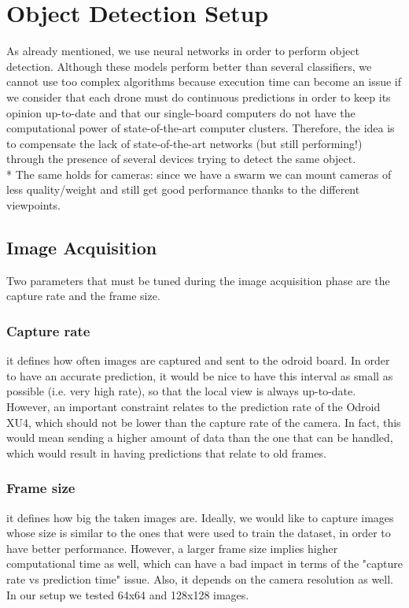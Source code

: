 \documentclass[10pt,conference,compsocconf]{IEEEtran}
\begin{document}
\section{Object Detection Setup}
\label{sec:obj_det_setup}
As already mentioned, we use neural networks in order to perform object detection. Although these models perform better than several classifiers, we cannot use too complex algorithms because execution time can become an issue if we consider that each drone must do continuous predictions in order to keep its opinion up-to-date and that our single-board computers do not have the computational power of state-of-the-art computer clusters. Therefore, the idea is to compensate the lack of state-of-the-art networks (but still performing!) through the presence of several devices trying to detect the same object.\\*
The same holds for cameras: since we have a swarm we can mount cameras of less quality/weight and still get good performance thanks to the different viewpoints.
\subsection{Image Acquisition}
Two parameters that must be tuned during the image acquisition phase are the capture rate and the frame size.
\subsubsection{Capture rate} it defines how often images are captured and sent to the odroid board. In order to have an accurate prediction, it would be nice to have this interval as small as possible (i.e. very high rate), so that the local view is always up-to-date.
However, an important constraint relates to the prediction rate of the Odroid XU4, which should not be lower than the capture rate of the camera. In fact, this would mean sending a higher amount of data than the one that can be handled, which would result in having predictions that relate to old frames.
\subsubsection{Frame size} it defines how big the taken images are. Ideally, we would like to capture images whose size is similar to the ones that were used to train the dataset, in order to have better performance. However, a larger frame size implies higher computational time as well, which can have a bad impact in terms of the "capture rate vs prediction time" issue. Also, it depends on the camera resolution as well.
In our setup we tested 64x64 and 128x128 images.
\end{document}
